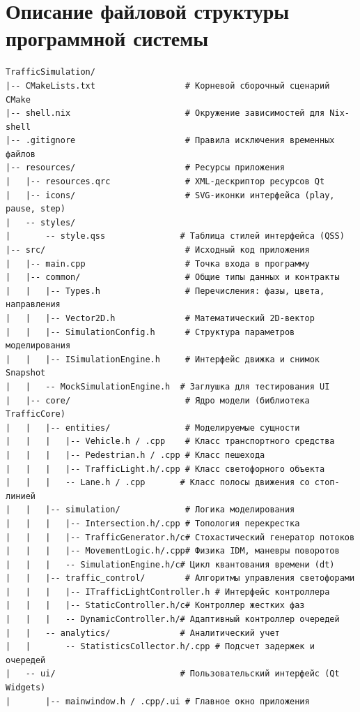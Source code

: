 \documentclass[11pt, a4paper]{article}
\begin{document}
\section{Описание файловой структуры программной системы}
{\footnotesize
\begin{verbatim}
TrafficSimulation/
|-- CMakeLists.txt                  # Корневой сборочный сценарий CMake
|-- shell.nix                       # Окружение зависимостей для Nix-shell
|-- .gitignore                      # Правила исключения временных файлов
|-- resources/                      # Ресурсы приложения
|   |-- resources.qrc               # XML-дескриптор ресурсов Qt
|   |-- icons/                      # SVG-иконки интерфейса (play, pause, step)
|   -- styles/
|       -- style.qss               # Таблица стилей интерфейса (QSS)
|-- src/                            # Исходный код приложения
|   |-- main.cpp                    # Точка входа в программу
|   |-- common/                     # Общие типы данных и контракты
|   |   |-- Types.h                 # Перечисления: фазы, цвета, направления
|   |   |-- Vector2D.h              # Математический 2D-вектор
|   |   |-- SimulationConfig.h      # Структура параметров моделирования
|   |   |-- ISimulationEngine.h     # Интерфейс движка и снимок Snapshot
|   |   -- MockSimulationEngine.h  # Заглушка для тестирования UI
|   |-- core/                       # Ядро модели (библиотека TrafficCore)
|   |   |-- entities/               # Моделируемые сущности
|   |   |   |-- Vehicle.h / .cpp    # Класс транспортного средства
|   |   |   |-- Pedestrian.h / .cpp # Класс пешехода
|   |   |   |-- TrafficLight.h/.cpp # Класс светофорного объекта
|   |   |   -- Lane.h / .cpp       # Класс полосы движения со стоп-линией
|   |   |-- simulation/             # Логика моделирования
|   |   |   |-- Intersection.h/.cpp # Топология перекрестка
|   |   |   |-- TrafficGenerator.h/c# Стохастический генератор потоков
|   |   |   |-- MovementLogic.h/.cpp# Физика IDM, маневры поворотов
|   |   |   -- SimulationEngine.h/c# Цикл квантования времени (dt)
|   |   |-- traffic_control/        # Алгоритмы управления светофорами
|   |   |   |-- ITrafficLightController.h # Интерфейс контроллера
|   |   |   |-- StaticController.h/c# Контроллер жестких фаз
|   |   |   -- DynamicController.h/# Адаптивный контроллер очередей
|   |   -- analytics/              # Аналитический учет
|   |       -- StatisticsCollector.h/.cpp # Подсчет задержек и очередей
|   -- ui/                         # Пользовательский интерфейс (Qt Widgets)
|       |-- mainwindow.h / .cpp/.ui # Главное окно приложения

\end{verbatim}}
\end{document}

